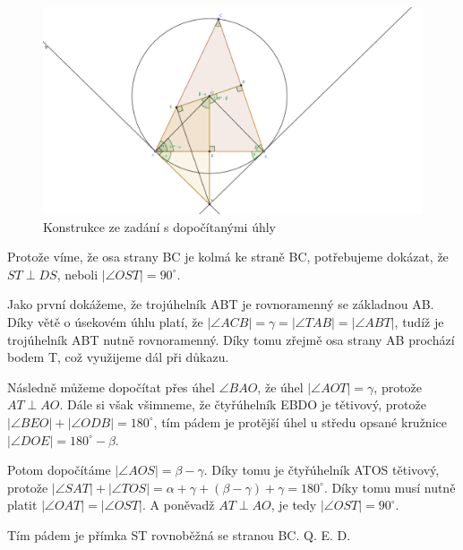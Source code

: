 \documentclass{fkssolpub}
\author{Ondřej Sedláček}
\begin{document}
 

\begin{figure}[h!]
  \centering
  \includegraphics{4-fig.png}
  \caption{Konstrukce ze zadání s dopočítanými úhly}
\end{figure}

Protože víme, že osa strany BC je kolmá ke straně BC, potřebujeme dokázat, že
$ST \perp DS$, neboli $|\angle OST| = 90^{\circ}$.

Jako první dokážeme, že trojúhelník ABT je rovnoramenný se základnou AB. Díky větě
o úsekovém úhlu platí, že $|\angle ACB| = \gamma = |\angle TAB| = |\angle ABT|$,
tudíž je trojúhelník ABT nutně rovnoramenný. Díky tomu zřejmě osa strany AB
prochází bodem T, což využijeme dál při důkazu.

Následně můžeme dopočítat přes úhel $\angle BAO$, že úhel $|\angle AOT| = \gamma$,
protože $AT \perp AO$. Dále si však všimneme, že čtyřúhelník EBDO je tětivový,
protože $|\angle BEO| + |\angle ODB| = 180^{\circ}$, tím pádem je protější
úhel u středu opsané kružnice $|\angle DOE| = 180^{\circ} - \beta$.

Potom dopočítáme $|\angle AOS| = \beta - \gamma$. Díky tomu je čtyřúhelník
ATOS tětivový, protože $|\angle SAT| + |\angle TOS| = \alpha + \gamma + (\beta - \gamma)
+ \gamma = 180^{\circ}$. Díky tomu musí nutně platit $|\angle OAT| = |\angle OST|$.
A poněvadž $AT \perp AO$, je tedy $|\angle OST| = 90^{\circ}$.

Tím pádem je přímka ST rovnoběžná se stranou BC. Q. E. D.
\end{document}
